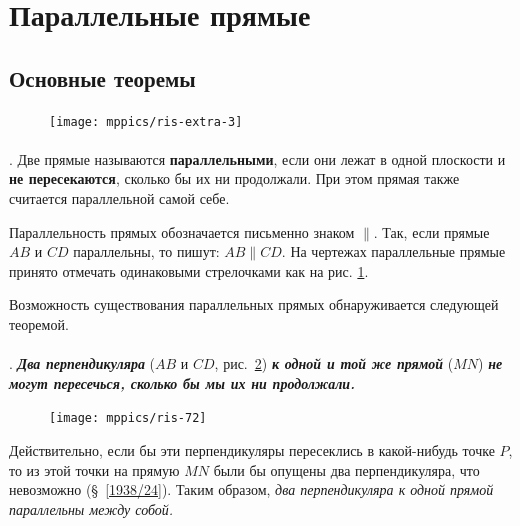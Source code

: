 \documentclass[twoside]{book}
\makeatletter
\newcommand{\rindex}[2][\imki@jobname]{%
  \index[#1]{\detokenize{#2}}%
}
\makeatother
\begin{document}
\section{Параллельные прямые}

\subsection*{Основные теоремы}

{

\begin{figure}
\vskip-5mm
\centering
\texttt{[image: mppics/ris-extra-3]}
\caption{}\label{extra/ris-3}
\end{figure}

\paragraph{}\label{1938/70}
\mbox{.}
Две прямые называются \rindex{параллельные прямые}\textbf{параллельными}, если они лежат в одной плоскости и \textbf{не пересекаются}, сколько бы их ни продолжали.
При этом прямая также считается параллельной самой себе.


Параллельность прямых обозначается письменно знаком $\parallel$.
Так, если прямые $AB$ и $CD$ параллельны, то пишут:
$AB \parallel CD$. 
На чертежах параллельные прямые принято отмечать одинаковыми стрелочками как на рис. \ref{extra/ris-3}.

Возможность существования параллельных прямых обнаруживается следующей теоремой.

}

\paragraph{}\label{1938/71}
\mbox{.}
\textbf{\emph{Два перпендикуляра}} ($AB$ и $CD$, рис.~\ref{1938/ris-72}) \textbf{\emph{к одной и той же прямой}} ($MN$) \textbf{\emph{не могут пересечься, сколько бы мы их ни продолжали.}}

\begin{figure}
\vskip-4mm
\centering
\texttt{[image: mppics/ris-72]}
\caption{}\label{1938/ris-72}
\end{figure}

Действительно, если бы эти перпендикуляры пересеклись в какой-нибудь точке $P$, то из этой точки на прямую $MN$ были бы опущены два перпендикуляра, что невозможно (§~\ref{1938/24}).
Таким образом, \emph{два перпендикуляра к одной прямой параллельны между собой.}
\end{document}

